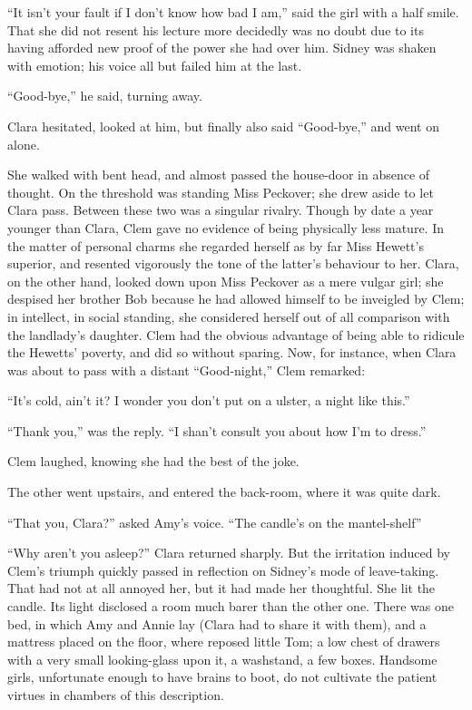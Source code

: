 ``It isn't your fault if I don't know how bad I am,'' said the girl with
a half smile. {}That she did not resent his lecture more decidedly was
no doubt due to its having afforded new proof of the power she had over
him. Sidney was shaken with emotion; his voice all but failed him at the
last.

``Good-bye,'' he said, turning away.

Clara hesitated, looked at him, but finally also said ``Good-bye,'' and
went on alone.

She walked with bent head, and almost passed the house-door in absence
of thought. On the threshold was standing Miss Peckover; she drew aside
to let Clara pass. Between these two was a singular rivalry. Though by
date a year younger than Clara, Clem gave no evidence of being
physically less mature. In the matter of personal charms she regarded
herself as by far Miss Hewett's superior, and resented vigorously the
tone of the latter's behaviour to her. Clara, on the other hand, looked
down upon Miss Peckover as a mere vulgar girl; she despised her brother
Bob because he had allowed himself to be inveigled by Clem; in
intellect, in social standing, she considered {}herself out of all
comparison with the landlady's daughter. Clem had the obvious advantage
of being able to ridicule the Hewetts' poverty, and did so without
sparing. Now, for instance, when Clara was about to pass with a distant
``Good-night,'' Clem remarked:

``It's cold, ain't it? I wonder you don't put on a ulster, a night like
this.''

``Thank you,'' was the reply. ``I shan't consult you about how I'm to
dress.''

Clem laughed, knowing she had the best of the joke.

The other went upstairs, and entered the back-room, where it was quite
dark.

``That you, Clara?'' asked Amy's voice. ``The candle's on the
mantel-shelf''

``Why aren't you asleep?'' Clara returned sharply. But the irritation
induced by Clem's triumph quickly passed in reflection on Sidney's mode
of leave-taking. That had not at all annoyed her, but it had made her
thoughtful. She lit the candle. Its light disclosed a room much barer
than the other one. There was one bed, in which Amy and Annie {}lay
(Clara had to share it with them), and a mattress placed on the floor,
where reposed little Tom; a low chest of drawers with a very small
looking-glass upon it, a washstand, a few boxes. Handsome girls,
unfortunate enough to have brains to boot, do not cultivate the patient
virtues in chambers of this description.

